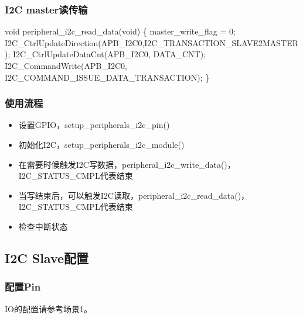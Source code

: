 \documentclass[
  12pt,
]{book}
\newenvironment{Shaded}{\begin{snugshade}}{\end{snugshade}}
\newcommand{\DataTypeTok}[1]{\textcolor[rgb]{0.13,0.29,0.53}{#1}}
\newcommand{\DecValTok}[1]{\textcolor[rgb]{0.00,0.00,0.81}{#1}}
\newcommand{\NormalTok}[1]{#1}
\providecommand{\tightlist}{%
  \setlength{\itemsep}{0pt}\setlength{\parskip}{0pt}}
\begin{document}
\hypertarget{i2c-masterux8bfbux4f20ux8f93}{%
\subsubsection{I2C master读传输}\label{i2c-masterux8bfbux4f20ux8f93}}

\begin{Shaded}
\begin{Highlighting}[]
\DataTypeTok{void}\NormalTok{ peripheral_i2c_read_data(}\DataTypeTok{void}\NormalTok{)}
\NormalTok{\{}
\NormalTok{  master_write_flag = }\DecValTok{0}\NormalTok{;}
\NormalTok{  I2C_CtrlUpdateDirection(APB_I2C0,I2C_TRANSACTION_SLAVE2MASTER);}
\NormalTok{  I2C_CtrlUpdateDataCnt(APB_I2C0, DATA_CNT);}
\NormalTok{  I2C_CommandWrite(APB_I2C0, I2C_COMMAND_ISSUE_DATA_TRANSACTION);}
\NormalTok{\}}
\end{Highlighting}
\end{Shaded}

\hypertarget{ux4f7fux7528ux6d41ux7a0b-8}{%
\subsubsection{使用流程}\label{ux4f7fux7528ux6d41ux7a0b-8}}

\begin{itemize}
\tightlist
\item
  设置GPIO，setup\_peripherals\_i2c\_pin()
\item
  初始化I2C，setup\_peripherals\_i2c\_module()
\item
  在需要时候触发I2C写数据，peripheral\_i2c\_write\_data()，I2C\_STATUS\_CMPL代表结束
\item
  当写结束后，可以触发I2C读取，peripheral\_i2c\_read\_data()，I2C\_STATUS\_CMPL代表结束
\item
  检查中断状态
\end{itemize}

\hypertarget{i2c-slaveux914dux7f6e-4}{%
\subsection{I2C Slave配置}\label{i2c-slaveux914dux7f6e-4}}

\hypertarget{ux914dux7f6epin-9}{%
\subsubsection{配置Pin}\label{ux914dux7f6epin-9}}

IO的配置请参考场景1。
\end{document}
